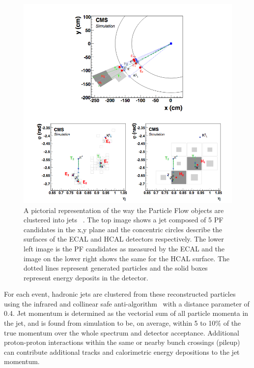 \begin{figure}[htb]
\centering
\includegraphics[width=1.0\textwidth]{Chapter-1/cmsPflowjet.png}
\caption{A pictorial representation of the way the Particle Flow objects are clustered into jets ~\cite{Sirunyan:2017ulk}. The top image shows a jet composed of 5 PF candidates in the x,y plane and the concentric circles describe the surfaces of the ECAL and HCAL detectors respectively. The lower left image is the PF candidates as measured by the ECAL and the image on the lower right shows the same for the HCAL surface. The dotted lines represent generated particles and the solid boxes represent energy deposits in the detector. }
\label{fig:cmsPFjet}
\end{figure}

For each event, hadronic jets are clustered from these reconstructed particles using the infrared and collinear safe anti-\kt algorithm~\cite{Cacciari:2008gp, Cacciari:2011ma} with a distance parameter of 0.4. Jet momentum is determined as the vectorial sum of all particle momenta in the jet, and is found from simulation to be, on average, within 5 to 10\% of the true momentum over the whole \pt spectrum and detector acceptance. Additional proton-proton interactions within the same or nearby bunch crossings (pileup) can contribute additional tracks and calorimetric energy depositions to the jet momentum. 

